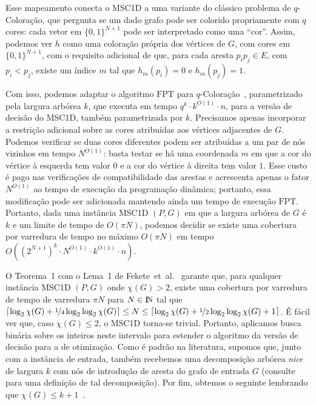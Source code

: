 \documentclass[12pt]{article}
\DeclarePairedDelimiter\ceil{\lceil}{\rceil}
\newcommand{\N}{\rm I\!N}
\begin{document}
Esse mapeamento conecta o MSC1D a uma variante do clássico problema de $q$-Coloração, que pergunta se um dado grafo pode ser colorido propriamente com $q$ cores: cada vetor em $\{0,1\}^{N+1}$ pode ser interpretado como uma ``cor''.
%
Assim, podemos ver $h$ como uma coloração própria dos vértices de $G$, com cores em $\{0,1\}^{N+1}$, com o requisito adicional de que, para cada aresta $p_ip_j\in E$, com $p_i<p_j$, existe um índice $m$ tal que $h_m(p_i)=0$ e $h_m(p_j)=1$.

Com isso, podemos adaptar o algoritmo $\text{FPT}$ para $q$-Coloração~\cite{Cy15}, parametrizado pela largura arbórea $k$, que executa em tempo $q^k\cdot k^{O(1)}\cdot n$, para a versão de decisão do MSC1D, também parametrizada por $k$.
%
Precisamos apenas incorporar a restrição adicional sobre as cores atribuídas aos vértices adjacentes de $G$.
%
Podemos verificar se duas cores diferentes podem ser atribuídas a um par de nós vizinhos em tempo $N^{O(1)}$: basta testar se há uma coordenada $m$ em que a cor do vértice à esquerda tem valor $0$ e a cor do vértice à direita tem valor $1$.
%
Esse custo é pago nas verificações de compatibilidade das arestas e acrescenta apenas o fator $N^{O(1)}$ ao tempo de execução da programação dinâmica; portanto, essa modificação pode ser adicionada mantendo ainda um tempo de execução $\text{FPT}$.
%
Portanto, dada uma instância MSC1D $(P, G)$ em que a largura arbórea de $G$ é $k$ e um limite de tempo de $O(\pi N)$, podemos decidir se existe uma cobertura por varredura de tempo no máximo $O(\pi N)$ em tempo $O((2^{N+1})^k\cdot N^{O(1)}\cdot k^{O(1)}\cdot n)$.

O Teorema~1 com o Lema~1 de Fekete~et~al.~\cite{Fe21} garante que, para qualquer instância MSC1D $(P, G)$ onde ${\chi(G) > 2}$, existe uma cobertura por varredura de tempo de varredura $\pi N$ para $N\in \N$ tal que
%
$\ceil{\log_2 \chi(G) + \nicefrac{1}{4}\log_2 \log_2 \chi(G)} \le N \leq \ceil{\log_2 \chi(G) + \nicefrac{1}{2}\log_2 \log_2 \chi(G) + 1}$.
%
É fácil ver que, caso ${\chi(G) \le 2}$, o MSC1D torna-se trivial.
%
Portanto, aplicamos busca binária sobre os inteiros neste intervalo para estender o algoritmo da versão de decisão para a de otimização.
%
Como é padrão na literatura, supomos que, junto com a instância de entrada, também recebemos uma decomposição arbórea \emph{nice} de largura $k$ com nós de introdução de aresta do grafo de entrada $G$ (consulte~\cite{Cy15} para uma definição de tal decomposição).
%
Por fim, obtemos o seguinte lembrando que $\chi(G) \leq k + 1$~\cite{Cy15}. \medskip
\end{document}
